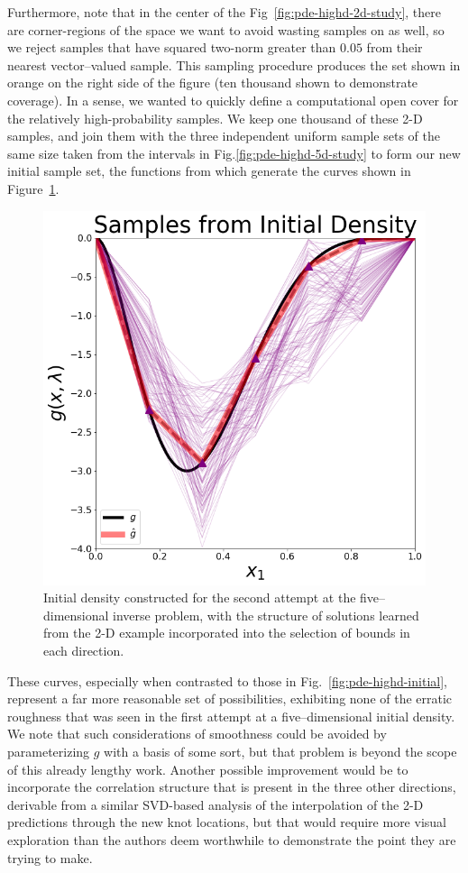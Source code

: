 Furthermore, note that in the center of the Fig~\ref{fig:pde-highd-2d-study}, there are corner-regions of the space we want to avoid wasting samples on as well, so we reject samples that have squared two-norm greater than $0.05$ from their nearest vector--valued sample.
This sampling procedure produces the set shown in orange on the right side of the figure (ten thousand shown to demonstrate coverage).
In a sense, we wanted to quickly define a computational open cover for the relatively high-probability samples.
We keep one thousand of these 2-D samples, and join them with the three independent uniform sample sets of the same size taken from the intervals in Fig.\ref{fig:pde-highd-5d-study} to form our new initial sample set, the functions from which generate the curves shown in Figure~\ref{fig:pde-highd-5d-init}.

\begin{figure}[htbp]
\centering
  \includegraphics[width=0.675\linewidth]{figures/pde-highd/pde-highd_init_D5-alt}
\caption{
Initial density constructed for the second attempt at the five--dimensional inverse problem, with the structure of solutions learned from the 2-D example incorporated into the selection of bounds in each direction.
}
\label{fig:pde-highd-5d-init}
\end{figure}

These curves, especially when contrasted to those in Fig.~\ref{fig:pde-highd-initial}, represent a far more reasonable set of possibilities, exhibiting none of the erratic roughness that was seen in the first attempt at a five--dimensional initial density.
We note that such considerations of smoothness could be avoided by parameterizing $g$ with a basis of some sort, but that problem is beyond the scope of this already lengthy work.
Another possible improvement would be to incorporate the correlation structure that is present in the three other directions, derivable from a similar SVD-based analysis of the interpolation of the 2-D predictions through the new knot locations, but that would require more visual exploration than the authors deem worthwhile to demonstrate the point they are trying to make.

